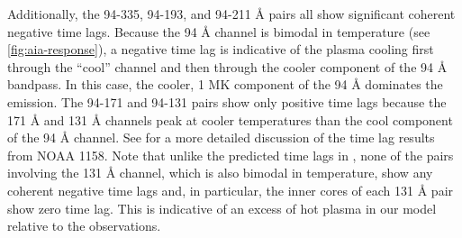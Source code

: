 Additionally, the 94-335, 94-193, and 94-211 \AA{} pairs all show significant coherent negative time lags.
Because the 94 \AA{} channel is bimodal in temperature (see \autoref{fig:aia-response}), a negative time lag is indicative of the plasma cooling first through the ``cool'' channel and then through the cooler component of the 94 \AA{} bandpass.
In this case, the cooler, 1 MK component of the 94 \AA{} dominates the emission.
The 94-171 and 94-131 pairs show only positive time lags because the 171 \AA{} and 131 \AA{} channels peak at cooler temperatures than the cool component of the 94 \AA{} channel.
See  for a more detailed discussion of the time lag results from NOAA 1158.
Note that unlike the predicted time lags in , none of the pairs involving the 131 \AA{} channel, which is also bimodal in temperature, show any coherent negative time lags and, in particular, the inner cores of each 131 \AA{} pair show zero time lag.
This is indicative of an excess of hot plasma in our model \AR{} relative to the observations.

